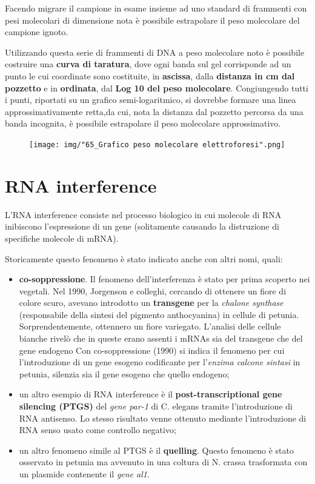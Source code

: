 \documentclass[11pt]{book}
\begin{document}
Facendo migrare il campione in esame insieme ad uno standard di
frammenti con pesi molecolari di dimensione nota è possibile estrapolare
il peso molecolare del campione ignoto.

Utilizzando questa serie di frammenti di DNA a peso molecolare noto è
possibile costruire una \textbf{curva di taratura}, dove ogni banda sul
gel corrisponde ad un punto le cui coordinate sono costituite, in
\textbf{ascissa}, dalla \textbf{distanza in cm dal pozzetto} e in
\textbf{ordinata}, dal \textbf{Log 10 del peso molecolare}. Congiungendo
tutti i punti, riportati su un grafico semi-logaritmico, si dovrebbe
formare una linea approssimativamente retta,da cui, nota la distanza dal
pozzetto percorsa da una banda incognita, è possibile estrapolare il
peso molecolare approssimativo.

\begin{figure}[htp]
\centering
\texttt{[image: img/"65\_Grafico peso molecolare elettroforesi".png]}
\caption{}
\label{grafico-peso-molecolare-elettroforesi}
\end{figure}

\section{RNA interference}\label{rna-interference}

L'RNA interference consiste nel processo biologico in cui molecole di
RNA inibiscono l'espressione di un gene (solitamente causando la
distruzione di specifiche molecole di mRNA).

Storicamente questo fenomeno è stato indicato anche con altri nomi,
quali:

\begin{itemize}
\itemsep1pt\parskip0pt
\item
  \textbf{co-soppressione}. Il fenomeno dell'interferenza è stato per
  prima scoperto nei vegetali. Nel 1990, Jorgenson e colleghi, cercando
  di ottenere un fiore di colore scuro, avevano introdotto un
  \textbf{transgene} per la \emph{chalone synthase} (responsabile della
  sintesi del pigmento anthocyanina) in cellule di petunia.
  Sorprendentemente, ottennero un fiore variegato. L'analisi delle
  cellule bianche rivelò che in queste erano assenti i mRNAs sia del
  transgene che del gene endogeno Con co-soppressione (1990) si indica
  il fenomeno per cui l'introduzione di un gene esogeno codificante per
  l'\emph{enzima calcone sintasi} in petunia, silenzia sia il gene
  esogeno che quello endogeno;
\item
  un altro esempio di RNA interference è il \textbf{post-transcriptional
  gene silencing (PTGS)} del \emph{gene par-1} di C. elegans tramite
  l'introduzione di RNA antisenso. Lo stesso risultato venne ottenuto
  mediante l'introduzione di RNA senso usato come controllo negativo;
\item
  un altro fenomeno simile al PTGS è il \textbf{quelling}. Questo
  fenomeno è stato osservato in petunia ma avvenuto in una coltura di N.
  crassa trasformata con un plasmide contenente il \emph{gene al1}.
\end{itemize}
\end{document}
